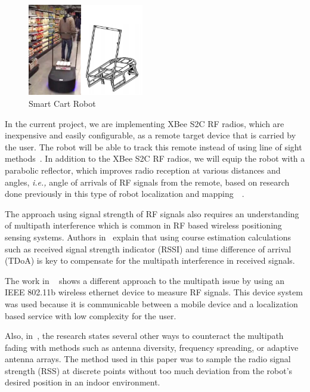 \begin{figure}[b]
   \centering
   \includegraphics[width=0.45\textwidth]{figs/img/SmartCart}
   \caption{Smart Cart Robot}
   \label{fig:SmartCart}
\end{figure}

\vspace*{12pt}
\noindent
In the current project, we are implementing XBee S2C RF radios, which are inexpensive and easily configurable, as a remote target device that is carried by the user. The robot will be able to track this remote instead of using line of sight methods~\cite{Miah2018-Intelligent}. In addition to the XBee S2C RF radios, we will equip the robot with a parabolic reflector, which improves radio reception at various distances and angles, \textit{i.e.,} angle of arrivals of RF signals from the remote, based on research done previously in this type of robot localization and mapping~\cite{Miah2018-Intelligent}~\cite{Li2013ANA}.

\vspace*{12pt}
\noindent
The approach using signal strength of RF signals also requires an understanding of multipath interference which is common in RF based wireless positioning sensing systems. Authors in~\cite{xie_jiang_zhao_zhang_2019} explain that using course estimation calculations such as received signal strength indicator (RSSI) and time difference of arrival (TDoA) is key to compensate for the multipath interference in received signals.

\vspace*{12pt}
\noindent
The work in ~\cite{ladd_bekris_rudys_kavraki_wallach_2005} shows a different approach to the multipath issue by using an IEEE 802.11b wireless ethernet device to measure RF signals. This device system was used because it is communicable between a mobile device and a localization based service with low complexity for the user.

\vspace*{12pt}
\noindent
Also, in~\cite{lindhe_johansson_bicchi_2007}, the research states several other ways to counteract the multipath fading with methods such as antenna diversity, frequency spreading, or adaptive antenna arrays. The method used in this paper was to sample the radio signal strength (RSS) at discrete points without too much deviation from the robot's desired position in an indoor environment.

